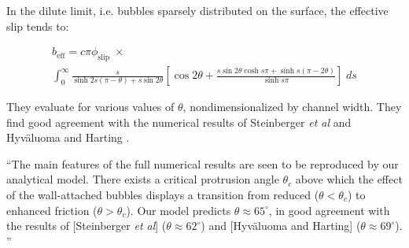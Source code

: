 \documentclass[a4paper]{report}
\newcommand{\beff}{\ensuremath{b_{\mathrm{eff}}}}
\newcommand{\phislip}{\ensuremath{\phi_{\mathrm{slip}}}}
\begin{document}
In the dilute limit, i.e. bubbles sparsely distributed on the surface, the effective slip tends to:

\begin{multline*}
\beff = c\pi \phislip \; \times \\
\int_0^{\infty}
\frac{s}{\sinh 2s(\pi -  \theta) + s \sin 2\theta}  \left[ \cos 2\theta + 
\frac{s \sin 2\theta \cosh s \pi + \sinh s(\pi - 2 \theta)}{\sinh s \pi}
\right] \; ds
\end{multline*}

\vspace{1em}

\begin{center}
\end{center}

They evaluate for various values of $\theta$, nondimensionalized by channel width.  They find good agreement with the numerical results of Steinberger \emph{et al} \cite{Steinberger2007} and Hyv\"{a}luoma and Harting \cite{HyvaluomaHarting2008}.

``The main features of the full numerical results are seen to be reproduced by our analytical model.  There exists a critical protrusion angle $ \theta_c$ above which the effect of the wall-attached bubbles displays a transition from reduced ($ \theta < \theta_c $) to enhanced friction ($ \theta > \theta_c $).  Our model predicts $ \theta \approx 65^{\circ} $, in good agreement with the results of [Steinberger \emph{et al}] ($ \theta \approx 62^{\circ} $) and [Hyv\"{a}luoma and Harting] ($ \theta \approx 69^{\circ} $). ''
\end{document}
